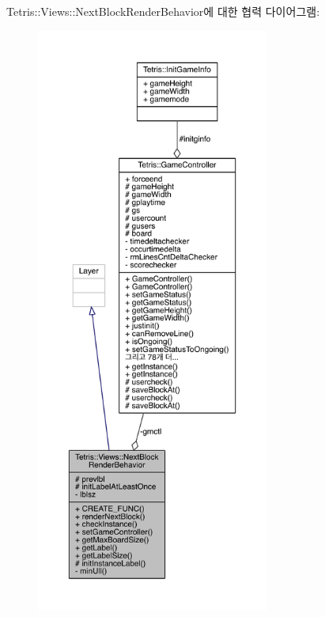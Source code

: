 Tetris\+:\+:Views\+:\+:Next\+Block\+Render\+Behavior에 대한 협력 다이어그램\+:
\nopagebreak
\begin{figure}[H]
\begin{center}
\leavevmode
\includegraphics[height=550pt]{dd/da1/class_tetris_1_1_views_1_1_next_block_render_behavior__coll__graph}
\end{center}
\end{figure}
